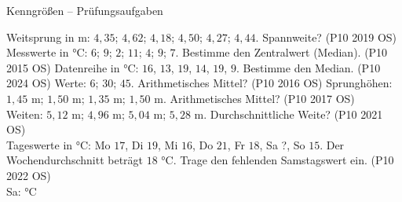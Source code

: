 \setcounter{aufgabe}{4}

\begin{aufgabe}{Kenngrößen – Prüfungsaufgaben}
\begin{teile}
\teil Weitsprung in m: $4{,}35$; $4{,}62$; $4{,}18$; $4{,}50$; $4{,}27$; $4{,}44$. Spannweite? \hfill (P10 2019 OS) \\ \leerfeld[m]
\teil Messwerte in °C: $6$; $9$; $2$; $11$; $4$; $9$; $7$. Bestimme den Zentralwert (Median). \hfill (P10 2015 OS)
\teil Datenreihe in °C: $16$, $13$, $19$, $14$, $19$, $9$. Bestimme den Median. \hfill (P10 2024 OS)
\teil Werte: $6$; $30$; $45$. Arithmetisches Mittel? \hfill (P10 2016 OS)
\teil Sprunghöhen: $1{,}45$ m; $1{,}50$ m; $1{,}35$ m; $1{,}50$ m. Arithmetisches Mittel? \hfill (P10 2017 OS) \\ \leerfeld[m]
\teil Weiten: $5{,}12$ m; $4{,}96$ m; $5{,}04$ m; $5{,}28$ m. Durchschnittliche Weite? \hfill (P10 2021 OS) \\ \leerfeld[m]
\teil Tageswerte in °C: Mo $17$, Di $19$, Mi $16$, Do $21$, Fr $18$, Sa ?, So $15$. Der Wochendurchschnitt beträgt $18$ °C. Trage den fehlenden Samstagswert ein. \hfill (P10 2022 OS) \\ Sa: \leerfeld °C
\end{teile}
\end{aufgabe}
